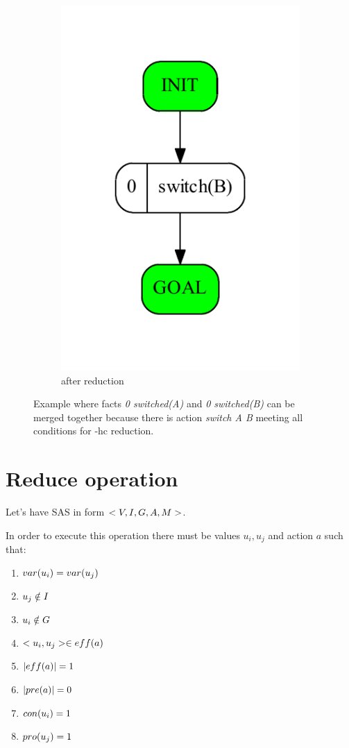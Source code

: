 \begin{figure}
\begin{subfigure}[b]{0.4\textwidth}
			\includegraphics[scale=0.4]{halfCycle/figures/simple_output}
			\caption{after reduction}
		\end{subfigure}
		\caption{Example where facts \emph{0 switched(A)} and \emph{0 switched(B)} can be merged together because there is action \emph{switch A B} meeting all conditions for -hc reduction. }
	\end{figure}


	\section{Reduce operation}
	Let's have SAS in form $<V, I, G, A, M{}>$. 
	
	In order to execute this operation there must be values $u_i, u_j$ and action $a$ such that:
	
	\begin{enumerate}
		\item $var(u_i) = var(u_j)$
		\item $u_j \notin I$ 
		\item $u_i \notin G$ 
		\item $<u_i,u_j> \in eff(a)$
		\item $|eff(a)| = 1$
		\item $|pre(a)| = 0$
		\item $con(u_i) = 1$
		\item $pro(u_j) = 1$ 
	\end{enumerate}
	
